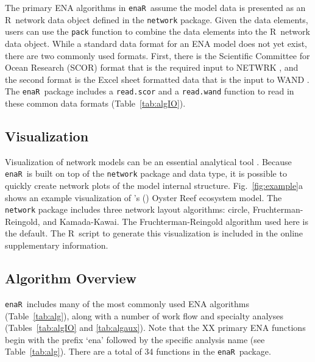 \documentclass[11pt]{article}
\def\citeapos#1{\citeauthor{#1}'s (\citeyear{#1})}
\newcommand{\R}{R}
\newcommand{\enaR}{\texttt{enaR}}
\begin{document}
\begin{spacing}{2}
The primary ENA algorithms in \enaR\ assume the model data is
presented as an \R\ network data object defined in the
\texttt{network} package.  Given the data elements, users can use
the \texttt{pack} function to combine the data elements into the \R\
network data object. While a standard data format for an ENA model
does not yet exist, there are two commonly used formats.  First, there
is the Scientific Committee for Ocean Research (SCOR) format that is
the required input to NETWRK \citep{ulanowicz91}, and the second
format is the Excel sheet formatted data that is the input to WAND
\citep{allesina04_wand}.  The \enaR\ package includes a
\texttt{read.scor} and a \texttt{read.wand} function to read in these
common data formats (Table~\ref{tab:algIO}).

\subsection{Visualization}
Visualization of network models can be an essential analytical tool
\citep{moody05dynamic, lima2011visual}.  Because \enaR\ is built on top
of the \texttt{network} package and data type, it is possible to
quickly create network plots of the model internal structure.
Fig.~\ref{fig:example}a shows an example visualization of
\citeapos{dame81} Oyster Reef ecosystem model.  The \texttt{network}
package includes three network layout algorithms: circle,
Fruchterman-Reingold, and Kamada-Kawai.  The Fruchterman-Reingold
algorithm used here is the default.  The \R\ script to generate this
visualization is included in the online supplementary information.

\subsection{Algorithm Overview}
\enaR\ includes many of the most commonly used ENA algorithms
(Table~\ref{tab:alg}), along with a number of work flow and specialty
analyses (Tables~\ref{tab:algIO} and \ref{tab:algaux}).  Note that the XX
primary ENA functions begin with the prefix `ena' followed by the
specific analysis name (see Table~\ref{tab:alg}).  There are a total
of 34 functions in the \enaR\ package.


\end{spacing}
\end{document}
